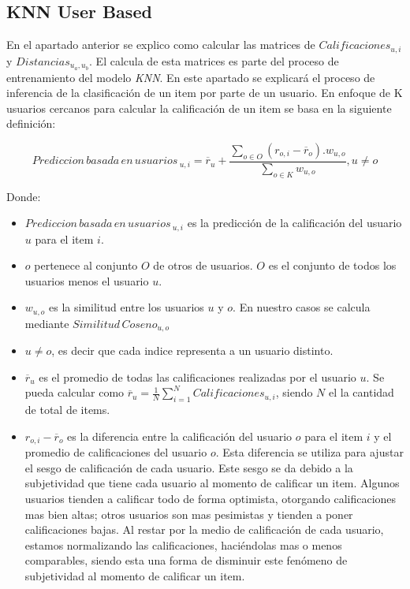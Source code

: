 \documentclass[11pt,a4paper,twoside]{thesis}
\begin{document}
\subsection{KNN User Based}

En el apartado anterior se explico como calcular las matrices de $Calificaciones_{u,i}$ y $Distancias_{u_a,u_b}$. El calcula de esta matrices es parte del proceso de entrenamiento del modelo \textit{KNN}. En este apartado se explicará el proceso de inferencia de la clasificación de un item por parte de un usuario. En enfoque de K usuarios cercanos para calcular la calificación de un item se basa en la siguiente definición:

\begin{equation}
	Prediccion \mspace{3mu}basada \mspace{3mu}en \mspace{3mu}usuarios\mspace{3mu}_{u, i} = \overline{r}_{u} + \frac{\sum_{o \in O} (r_{o, i} - \overline{r}_o) . w_{u, o} }{ \sum_{o \in K} w_{u, o}}, u \neq o
\end{equation}

\begin{description}
	\item[Donde:]
\end{description}
\begin{itemize}
	\item $Prediccion \mspace{3mu}basada \mspace{3mu}en \mspace{3mu}usuarios\mspace{3mu}_{u, i}$ es la predicción de la calificación del usuario $u$ para el item $i$.
	\item $o$ pertenece al conjunto $O$ de otros de usuarios. $O$ es el conjunto de todos los usuarios menos el usuario $u$.
	\item $w_{u,o}$ es la similitud entre los usuarios $u$ y $o$. En nuestro casos se calcula mediante $Similitud \mspace{3mu}Coseno_{u, o}$
	\item $u \neq o$, es decir que cada indice representa a un usuario distinto.
	\item $\overline{r}_{u}$ es el promedio de todas las calificaciones realizadas por el usuario $u$. Se pueda calcular como $\overline{r}_{u} = \frac{1}{N} \sum_{i=1}^N Calificaciones_{u,i}$, siendo $N$ el la cantidad de total de items.
 	\item $r_{o,i} - \overline{r}_{o}$ es la diferencia entre la calificación del usuario $o$ para el item $i$ y el promedio de calificaciones del usuario $o$. Esta diferencia se utiliza para ajustar el sesgo de calificación de cada usuario. Este sesgo se da debido a la subjetividad que tiene cada usuario al momento de calificar un item. Algunos usuarios tienden a calificar todo de forma optimista, otorgando calificaciones mas bien altas; otros usuarios son mas pesimistas y tienden a poner calificaciones bajas. Al restar por la medio de calificación de cada usuario, estamos normalizando las calificaciones, haciéndolas mas o menos comparables, siendo esta una forma de disminuir este fenómeno de subjetividad al momento de calificar un item.
\end{itemize}
\end{document}
